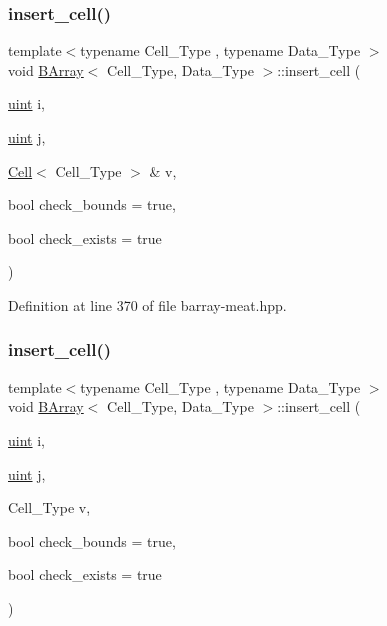 \subsubsection{\texorpdfstring{insert\+\_\+cell()}{insert\_cell()}\hspace{0.1cm}{\footnotesize\ttfamily [1/6]}}
{\footnotesize\ttfamily template$<$typename Cell\+\_\+\+Type , typename Data\+\_\+\+Type $>$ \\
void \hyperlink{class_b_array}{B\+Array}$<$ Cell\+\_\+\+Type, Data\+\_\+\+Type $>$\+::insert\+\_\+cell (\begin{DoxyParamCaption}\item[{\hyperlink{typedefs_8hpp_a91ad9478d81a7aaf2593e8d9c3d06a14}{uint}}]{i,  }\item[{\hyperlink{typedefs_8hpp_a91ad9478d81a7aaf2593e8d9c3d06a14}{uint}}]{j,  }\item[{\hyperlink{class_cell}{Cell}$<$ Cell\+\_\+\+Type $>$ \&}]{v,  }\item[{bool}]{check\+\_\+bounds = {\ttfamily true},  }\item[{bool}]{check\+\_\+exists = {\ttfamily true} }\end{DoxyParamCaption})\hspace{0.3cm}{\ttfamily [inline]}}



Definition at line 370 of file barray-\/meat.\+hpp.

\mbox{\label{group__barray-insert_gaa7268761d977833b688123d161d17d1b}} 
\subsubsection{\texorpdfstring{insert\+\_\+cell()}{insert\_cell()}\hspace{0.1cm}{\footnotesize\ttfamily [2/6]}}
{\footnotesize\ttfamily template$<$typename Cell\+\_\+\+Type , typename Data\+\_\+\+Type $>$ \\
void \hyperlink{class_b_array}{B\+Array}$<$ Cell\+\_\+\+Type, Data\+\_\+\+Type $>$\+::insert\+\_\+cell (\begin{DoxyParamCaption}\item[{\hyperlink{typedefs_8hpp_a91ad9478d81a7aaf2593e8d9c3d06a14}{uint}}]{i,  }\item[{\hyperlink{typedefs_8hpp_a91ad9478d81a7aaf2593e8d9c3d06a14}{uint}}]{j,  }\item[{Cell\+\_\+\+Type}]{v,  }\item[{bool}]{check\+\_\+bounds = {\ttfamily true},  }\item[{bool}]{check\+\_\+exists = {\ttfamily true} }\end{DoxyParamCaption})\hspace{0.3cm}{\ttfamily [inline]}}



